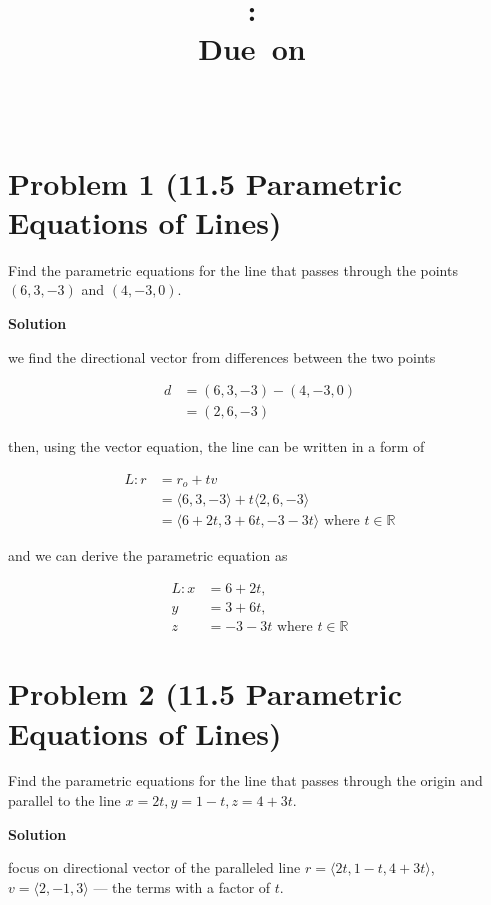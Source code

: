 \documentclass{article}
\title{
    \vspace{2in}
    \textmd{\textbf{\hmwkClass:\ \hmwkTitle}}\\
    \normalsize\vspace{0.1in}\small{Due\ on\ \hmwkDueDate}\\
    \vspace{0.1in}\large{\textit{\hmwkClassInstructor\ \hmwkClassTime}}
    \vspace{3in}
}
\author{\hmwkAuthorName}
\date{}
\newcommand{\solution}{\textbf{\large Solution}}
\theoremstyle{remark}
\begin{document}
\maketitle
\newpage

\section*{Problem 1 (11.5 Parametric Equations of Lines)}
Find the parametric equations for the line that passes through the points $(6, 3, -3)$ and $(4, -3, 0)$.

\medskip
\solution

we find the directional vector from differences between the two points

\[
  \begin{aligned}
  d &= (6, 3, -3) - (4, -3, 0) \\
  &= (2, 6, -3)
  \end{aligned}
\]

then, using the vector equation, the line can be written in a form of

\[
  \begin{aligned}
  L: r &= r_o + tv \\
  &= \langle 6, 3, -3\rangle + t\langle 2, 6, -3\rangle \\
  &= \langle 6 + 2t, 3 + 6t, -3 - 3t\rangle \text{ where } t \in \mathbb{R}
  \end{aligned}
\]

  and we can derive the parametric equation as

\[
  \boxed{
  \begin{aligned}
  L: x &= 6 + 2t, \\
  y &= 3 + 6t, \\
  z &= -3 - 3t \text{ where } t \in \mathbb{R}
  \end{aligned}}
\]

\vspace{1em}
\hrulefill

\section*{Problem 2 (11.5 Parametric Equations of Lines)}
Find the parametric equations for the line that passes through the origin and parallel to the line $x = 2t, y = 1 - t, z = 4 + 3t$.

\medskip
\solution

focus on directional vector of the paralleled line $r = \langle 2t, 1-t,
  4+3t\rangle$, $v = \langle 2, -1, 3\rangle$ --- the terms with a factor of $t$. \\
\end{document}
